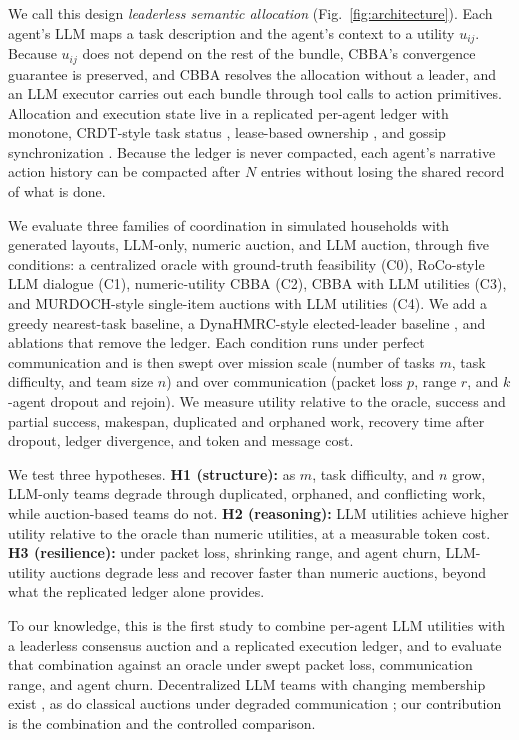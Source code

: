 \documentclass[letterpaper]{article}
\begin{document}
We call this design \emph{leaderless semantic allocation} (Fig.~\ref{fig:architecture}). Each agent's LLM maps a task description and the agent's context to a utility $u_{ij}$. Because $u_{ij}$ does not depend on the rest of the bundle, CBBA's convergence guarantee is preserved, and CBBA \citep{choi2009cbba} resolves the allocation without a leader, and an LLM executor carries out each bundle through tool calls to action primitives. Allocation and execution state live in a replicated per-agent ledger with monotone, CRDT-style task status \citep{shapiro2011crdt}, lease-based ownership \citep{gray1989leases}, and gossip synchronization \citep{demers1987epidemic}. Because the ledger is never compacted, each agent's narrative action history can be compacted after $N$ entries without losing the shared record of what is done.

We evaluate three families of coordination in simulated households with generated layouts, LLM-only, numeric auction, and LLM auction, through five conditions: a centralized oracle with ground-truth feasibility (C0), RoCo-style LLM dialogue \citep{mandi2024roco} (C1), numeric-utility CBBA (C2), CBBA with LLM utilities (C3), and MURDOCH-style single-item auctions with LLM utilities \citep{gerkey2002sold} (C4). We add a greedy nearest-task baseline, a DynaHMRC-style elected-leader baseline \citep{dynahmrc2026}, and ablations that remove the ledger. Each condition runs under perfect communication and is then swept over mission scale (number of tasks $m$, task difficulty, and team size $n$) and over communication (packet loss $p$, range $r$, and $k$-agent dropout and rejoin). We measure utility relative to the oracle, success and partial success, makespan, duplicated and orphaned work, recovery time after dropout, ledger divergence, and token and message cost.

We test three hypotheses. \textbf{H1 (structure):} as $m$, task difficulty, and $n$ grow, LLM-only teams degrade through duplicated, orphaned, and conflicting work, while auction-based teams do not. \textbf{H2 (reasoning):} LLM utilities achieve higher utility relative to the oracle than numeric utilities, at a measurable token cost. \textbf{H3 (resilience):} under packet loss, shrinking range, and agent churn, LLM-utility auctions degrade less and recover faster than numeric auctions, beyond what the replicated ledger alone provides.

To our knowledge, this is the first study to combine per-agent LLM utilities with a leaderless consensus auction and a replicated execution ledger, and to evaluate that combination against an oracle under swept packet loss, communication range, and agent churn. Decentralized LLM teams with changing membership exist \citep{dynahmrc2026}, as do classical auctions under degraded communication \citep{ponda2010dynamic, otte2020auctions, degradedmrta2026}; our contribution is the combination and the controlled comparison.
\end{document}
